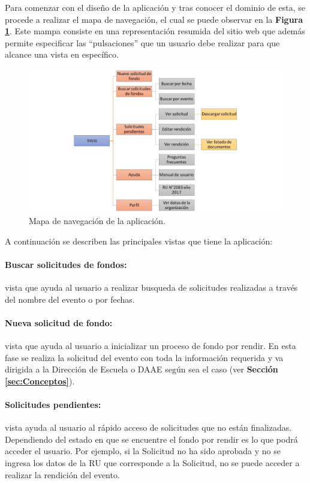 Para comenzar con el diseño de la aplicación y tras conocer el dominio de esta, se procede a realizar el mapa de navegación, el cual se puede observar en la \textbf{Figura \ref{fig: Mapa_navegacion}}. Este mampa consiste en una representación resumida del sitio web que además permite especificar las ``pulsaciones'' que un usuario debe realizar para que alcance una vista en específico.

\begin{figure}[h!tb]
    \hspace{-9mm}
    \includegraphics[width=1.1\textwidth]{Imagenes/Mapa_de_navegacion.jpg}
    \caption{\label{fig: Mapa_navegacion}Mapa de navegación de la aplicación.}
\end{figure}

A continuación se describen las principales vistas que tiene la aplicación:

\paragraph{Buscar solicitudes de fondos: }vista que ayuda al usuario a realizar busqueda de solicitudes realizadas a través del nombre del evento o por fechas.

\paragraph{Nueva solicitud de fondo: }vista que ayuda al usuario a inicializar un proceso de fondo por rendir. En esta fase se realiza la solicitud del evento con toda la información requerida y va dirigida a la Dirección de Escuela o DAAE según sea el caso (ver \textbf{Sección \ref{sec:Conceptos}}).

\paragraph{Solicitudes pendientes: }vista ayuda al usuario al rápido acceso de solicitudes que no están finalizadas. Dependiendo del estado en que se encuentre el fondo por rendir es lo que podrá acceder el usuario. Por ejemplo, si la Solicitud no ha sido aprobada y no se ingresa los datos de la RU que corresponde a la Solicitud, no se puede acceder a realizar la rendición del evento.

